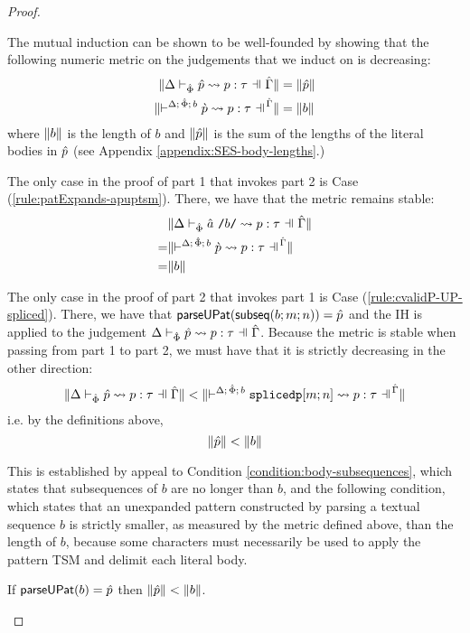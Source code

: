 {{{{\begin{proof}
\begin{enumerate}
\begin{byCases}
      \resetpfcounter
  \end{byCases}
  \end{enumerate}
The mutual induction can be shown to be well-founded by showing that the following numeric metric on the judgements that we induct on is decreasing:
\begin{align*}
\sizeof{\patExpands{\upctx}{\uPhi}{\upv}{p}{\tau}} & = \sizeof{\upv}\\
\sizeof{{\cvalidP{\upctx}{\pscene{\Delta}{\uPhi}{b}}{\cpv}{p}{\tau}}} & = \sizeof{b}
\end{align*}
where $\Vert b \Vert$ is the length of $b$ and $\Vert \hat{p} \Vert$ is the sum of the lengths of the literal bodies in $\hat{p}$ (see Appendix \ref{appendix:SES-body-lengths}.)

The only case in the proof of part 1 that invokes part 2 is Case (\ref{rule:patExpands-apuptsm}). There, we have that the metric remains stable: \begin{align*}
 & \sizeof{\patExpands{\upctx}{\uPhi}{\utsmap{\tsmv}{b}}{p}{\tau}}\\
=& \sizeof{{\cvalidP{\upctx}{\pscene{\Delta}{\uPhi}{b}}{\cpv}{p}{\tau}}}\\
=&\sizeof{b}\end{align*}

The only case in the proof of part 2 that invokes part 1 is Case (\ref{rule:cvalidP-UP-spliced}). There, we have that $\mathsf{parseUPat}(\mathsf{subseq}(b; m; n))=\hat{p}$ and the IH is applied to the judgement $\patExpands{\upctx}{\uPhi}{\upv}{p}{\tau}$. Because the metric is stable when passing from part 1 to part 2, we must have that it is strictly decreasing in the other direction:
\[\sizeof{\patExpands{\upctx}{\uPhi}{\upv}{p}{\tau}} < \sizeof{{\cvalidP{\upctx}{\pscene{\Delta}{\uPhi}{b}}{\acesplicedp{m}{n}}{p}{\tau}}}\]
i.e. by the definitions above, 
\[\Vert \hat{p} \Vert < \Vert b \Vert\]

This is established by appeal to Condition \ref{condition:body-subsequences}, which states that subsequences of $b$ are no longer than $b$, and the following condition, which states that an unexpanded pattern constructed by parsing a textual sequence $b$ is strictly smaller, as measured by the metric defined above, than the length of $b$, because some characters must necessarily be used to apply the pattern TSM and delimit each literal body.
\begingroup
\def\thetheorem{\ref{condition:pattern-parsing}}
\begin{condition} If $\mathsf{parseUPat}(b)=\hat{p}$ then $\Vert \hat{p} \Vert < \Vert b \Vert$.\end{condition}
\endgroup


\end{proof}}}}}
